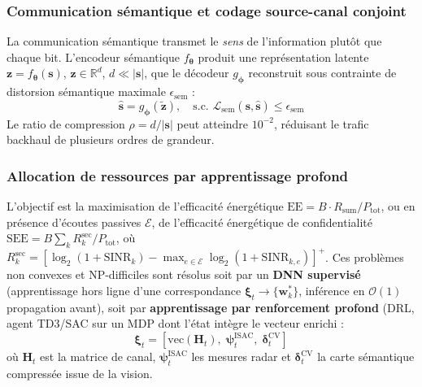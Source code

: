 \documentclass[12pt,a4paper,titlepage]{article}
\begin{document}
\subsubsection{Communication sémantique et codage source-canal conjoint}

La communication sémantique transmet le \textit{sens} de l'information plutôt que chaque bit. L'encodeur sémantique $f_{\boldsymbol{\theta}}$ produit une représentation latente $\mathbf{z} = f_{\boldsymbol{\theta}}(\mathbf{s})$, $\mathbf{z} \in \mathbb{R}^d$, $d \ll |\mathbf{s}|$, que le décodeur $g_{\boldsymbol{\phi}}$ reconstruit sous contrainte de distorsion sémantique maximale $\epsilon_{\mathrm{sem}}$ :
\begin{equation}
    \hat{\mathbf{s}} = g_{\boldsymbol{\phi}}(\tilde{\mathbf{z}}), \quad \text{s.c. } \mathcal{L}_{\mathrm{sem}}(\mathbf{s}, \hat{\mathbf{s}}) \leq \epsilon_{\mathrm{sem}}
    \label{eq:semantic_decoder}
\end{equation}
Le ratio de compression $\rho = d/|\mathbf{s}|$ peut atteindre $10^{-2}$, réduisant le trafic backhaul de plusieurs ordres de grandeur.

\subsubsection{Allocation de ressources par apprentissage profond}

L'objectif est la maximisation de l'efficacité énergétique $\mathrm{EE} = B \cdot R_{\mathrm{sum}} / P_{\mathrm{tot}}$, ou en présence d'écoutes passives $\mathcal{E}$, de l'efficacité énergétique de confidentialité $\mathrm{SEE} = B \sum_k R_k^{\mathrm{sec}} / P_{\mathrm{tot}}$, où $R_k^{\mathrm{sec}} = [\log_2(1+\mathrm{SINR}_k) - \max_{e\in\mathcal{E}} \log_2(1+\mathrm{SINR}_{k,e})]^+$. Ces problèmes non convexes et NP-difficiles sont résolus soit par un \textbf{DNN supervisé} (apprentissage hors ligne d'une correspondance $\boldsymbol{\xi}_t \to \{\mathbf{w}_k^*\}$, inférence en $\mathcal{O}(1)$ propagation avant), soit par \textbf{apprentissage par renforcement profond} (DRL, agent TD3/SAC sur un MDP dont l'état intègre le vecteur enrichi :
\begin{equation}
    \boldsymbol{\xi}_t = \left[ \mathrm{vec}(\mathbf{H}_t),\; \boldsymbol{\psi}_t^{\mathrm{ISAC}},\; \boldsymbol{\delta}_t^{\mathrm{CV}} \right]
    \label{eq:state_vector}
\end{equation}
où $\mathbf{H}_t$ est la matrice de canal, $\boldsymbol{\psi}_t^{\mathrm{ISAC}}$ les mesures radar et $\boldsymbol{\delta}_t^{\mathrm{CV}}$ la carte sémantique compressée issue de la vision.
\end{document}

